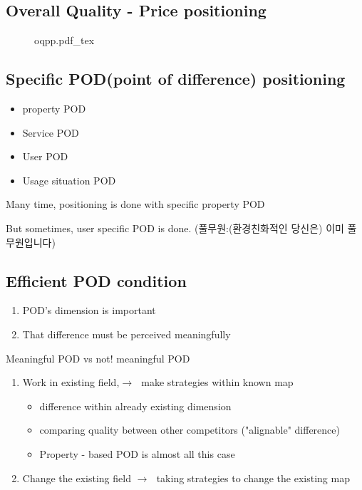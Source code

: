 \documentclass[12pt]{article}
\newcommand{\ra}{$\rightarrow \text{ }$}
\begin{document}
\subsection{Overall Quality - Price positioning}
\begin{figure}[H]
	\centering
	\def\svgwidth{\columnwidth}
	{oqpp.pdf_tex}
	\caption{}
	\label{fig:oqpp}
\end{figure}
\subsection{Specific POD(point of difference) positioning}
\begin{itemize}
	\item property POD
	\item Service POD
	\item User POD
	\item Usage situation POD
\end{itemize}
{\large Many time, positioning is done with specific property POD}

But sometimes, user specific POD is done. (풀무원:(환경친화적인 당신은) 이미 풀무원입니다)

\subsection{Efficient POD condition}
\begin{enumerate}
	\item POD's dimension is important
	\item That difference must be perceived meaningfully
\end{enumerate}

\begin{center}
	Meaningful POD vs not! meaningful POD

\end{center}
\begin{enumerate}
	\item Work in existing field,\ra make strategies within known map
	\begin{itemize}
		\item difference within already existing dimension
		\item comparing quality between other competitors ("alignable" difference)
		\item Property - based POD is almost all this case
	\end{itemize}
	\item Change the existing field \ra taking strategies to change the existing map
\end{enumerate}
\end{document}
